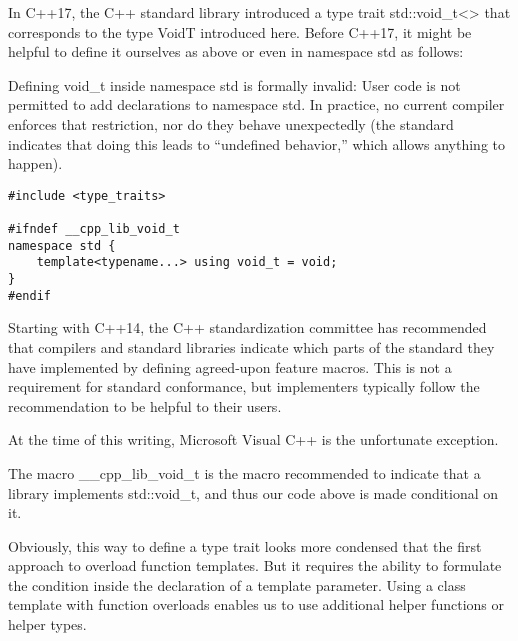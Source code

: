 In C++17, the C++ standard library introduced a type trait std::void\_t<> that corresponds to the type VoidT introduced here. Before C++17, it might be helpful to define it ourselves as above or even in namespace std as follows:

\begin{tcolorbox}[colback=webgreen!5!white,colframe=webgreen!75!black]
\hspace*{0.75cm}Defining void\_t inside namespace std is formally invalid: User code is not permitted to add declarations to namespace std. In practice, no current compiler enforces that restriction, nor do they behave unexpectedly (the standard indicates that doing this leads to “undefined behavior,” which allows anything to happen).
\end{tcolorbox}

\begin{lstlisting}[style=styleCXX]
#include <type_traits>

#ifndef __cpp_lib_void_t
namespace std {
	template<typename...> using void_t = void;
}
#endif
\end{lstlisting}

Starting with C++14, the C++ standardization committee has recommended that compilers and standard libraries indicate which parts of the standard they have implemented by defining agreed-upon feature macros. This is not a requirement for standard conformance, but implementers typically follow the recommendation to be helpful to their users.

\begin{tcolorbox}[colback=webgreen!5!white,colframe=webgreen!75!black]
\hspace*{0.75cm}At the time of this writing, Microsoft Visual C++ is the unfortunate exception.
\end{tcolorbox}

The macro \_\_cpp\_lib\_void\_t is the macro recommended to indicate that a library implements std::void\_t, and thus our code above is made conditional on it.

Obviously, this way to define a type trait looks more condensed that the first approach to overload function templates. But it requires the ability to formulate the condition inside the declaration of a template parameter. Using a class template with function overloads enables us to use additional helper functions or helper types.


